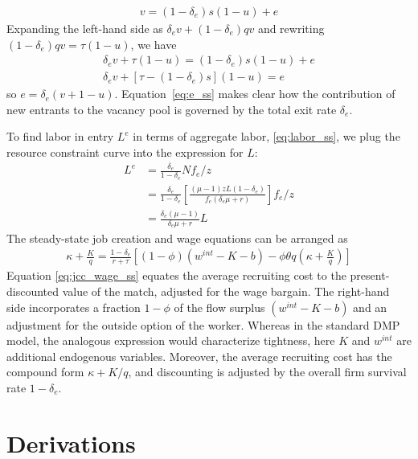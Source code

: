 \documentclass[authoryear, review, 12pt]{elsarticle}
\begin{document}
	\begin{align}
		[1-(1-\delta_e)(1-q)]v=(1-\delta_e)s(1-u)+e
	\end{align}
	Expanding the left-hand side as $\delta_e v+(1-\delta_e)qv$ and rewriting $(1-\delta_e)qv=\tau(1-u)$, we have
	\begin{align}
		\delta_e v+\tau(1-u)=(1-\delta_e)s(1-u)+e\\
		\delta_e v + [\tau-(1-\delta_e)s](1-u)=e
	\end{align}
	so $e=\delta_e(v+1-u)$. Equation~\eqref{eq:e_ss} makes clear how the contribution of new entrants to the vacancy pool is governed by the total exit rate $\delta_e$.
	
	To find labor in entry $L^e$ in terms of aggregate labor, \eqref{eq:labor_ss}, we plug the resource constraint curve into the expression for $L$:
	\begin{align}
		L^e&=\frac{\delta_e}{1-\delta_e}Nf_e/z\\
		&=\frac{\delta_e}{1-\delta_e}\left[\frac{(\mu-1)zL(1-\delta_e)}{f_e(\delta_e \mu+r)}\right]f_e/z\\
		&=\frac{\delta_e(\mu-1)}{\delta_e \mu+r}L
	\end{align}
	The steady-state job creation and wage equations can be arranged as
	\begin{align}\label{eq:jcc_wage_ss}
		\kappa+\frac{K}{q}=\frac{1-\delta_e}{r+\tau}\left[(1-\phi)(w^{int}-K-b)-\phi \theta q\!\left(\kappa+\frac{K}{q}\right)\right]
	\end{align}
	Equation \eqref{eq:jcc_wage_ss} equates the average recruiting cost to the present-discounted value of the match, adjusted for the wage bargain. The right-hand side incorporates a fraction $1-\phi$ of the flow surplus $(w^{int}-K-b)$ and an adjustment for the outside option of the worker. Whereas in the standard DMP model, the analogous expression would characterize tightness, here $K$ and $w^{int}$ are additional endogenous variables. Moreover, the average recruiting cost has the compound form $\kappa+K/q$, and discounting is adjusted by the overall firm survival rate $1-\delta_e$.
	
	\section{Derivations}
\end{document}
